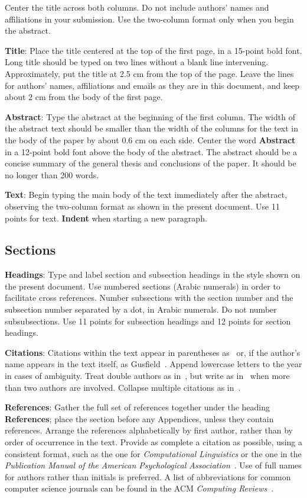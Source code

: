 \documentclass[11pt]{article}
\begin{document}
Center the title across both columns. Do not include authors' names and affiliations in your submission. Use the two-column format only when you begin the abstract.

{\bf Title}: Place the title centered at the top of the first page, in
a 15-point bold font. Long title should be typed on two lines without
a blank line intervening. Approximately, put the title at 2.5 cm from
the top of the page. Leave the lines for authors' names, affiliations and emails as they are in this document, and keep about 2 cm from the body of the first page.

{\bf Abstract}: Type the abstract at the beginning of the first
column. The width of the abstract text should be smaller than the
width of the columns for the text in the body of the paper by about
0.6 cm on each side. Center the word {\bf Abstract} in a 12-point bold
font above the body of the abstract. The abstract should be a concise
summary of the general thesis and conclusions of the paper. It should
be no longer than 200 words.

{\bf Text}: Begin typing the main body of the text immediately after
the abstract, observing the two-column format as shown in 
the present document. Use 11 points for text. {\bf Indent} when starting a new paragraph.


\subsection{Sections}

{\bf Headings}: Type and label section and subsection headings in the
style shown on the present document.  Use numbered sections (Arabic
numerals) in order to facilitate cross references. Number subsections
with the section number and the subsection number separated by a dot,
in Arabic numerals. Do not number subsubsections. Use 11 points for subsection headings and 12 points for section headings.

{\bf Citations}: Citations within the text appear
in parentheses as~\cite{Gusfield:97} or, if the author's name appears in
the text itself, as Gusfield~. 
Append lowercase letters to the year in cases of ambiguity.  
Treat double authors as in~\cite{Aho:72}, but write as 
in~\cite{Chandra:81} when more than two authors are involved. 
Collapse multiple citations as in~\cite{Gusfield:97,Aho:72}.

\textbf{References}: Gather the full set of references together under
the heading {\bf References}; place the section before any Appendices,
unless they contain references. Arrange the references alphabetically
by first author, rather than by order of occurrence in the text.
Provide as complete a citation as possible, using a consistent format,
such as the one for {\em Computational Linguistics\/} or the one in the 
{\em Publication Manual of the American 
Psychological Association\/}~\cite{APA:83}.  Use of full names for
authors rather than initials is preferred.  A list of abbreviations
for common computer science journals can be found in the ACM 
{\em Computing Reviews\/}~\cite{ACM:83}.
\end{document}
